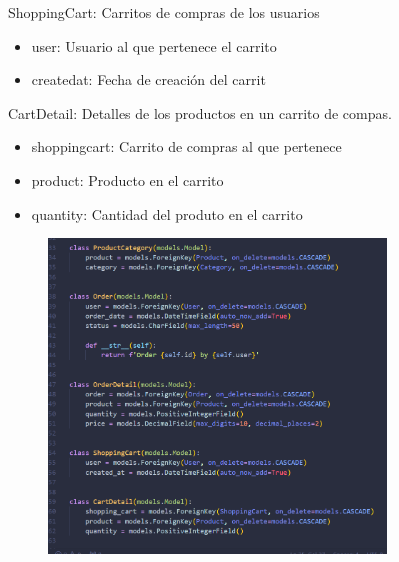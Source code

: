 \documentclass{article}
\begin{document}
ShoppingCart: Carritos de compras de los usuarios
\begin{itemize}
    \item user: Usuario al que pertenece el carrito
    \item createdat: Fecha de creación del carrit
\end{itemize}
CartDetail: Detalles de los productos en un carrito de compas.
\begin{itemize}
    \item shoppingcart: Carrito de compras al que pertenece
    \item product: Producto en el carrito
    \item quantity: Cantidad del produto en el carrito
\end{itemize}
    \begin{figure}[H]
		          \centering
		          \includegraphics[width=0.8\textwidth,keepaspectratio]                       {img/PrctOrDetShoCart.png}
    \end{figure}
\
\end{document}
